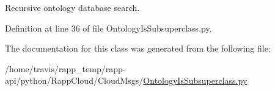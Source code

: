 Recursive ontology database search. 



Definition at line 36 of file Ontology\-Is\-Subsuperclass.\-py.



The documentation for this class was generated from the following file\-:\begin{DoxyCompactItemize}
\item 
/home/travis/rapp\-\_\-temp/rapp-\/api/python/\-Rapp\-Cloud/\-Cloud\-Msgs/\hyperlink{OntologyIsSubsuperclass_8py}{Ontology\-Is\-Subsuperclass.\-py}\end{DoxyCompactItemize}
